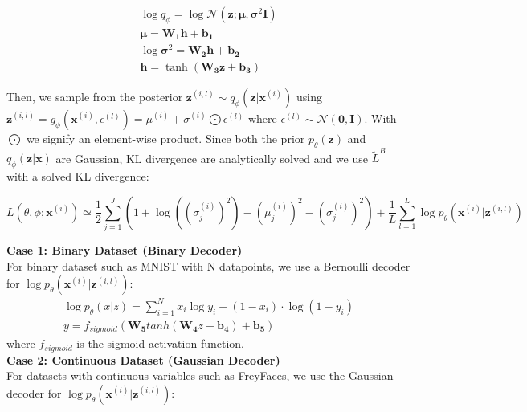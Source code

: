 \documentclass[11pt]{article}
\begin{document}
\begin{eqnarray}
\log q_\phi=\log\mathcal{N}(\mathbf{z}; \mathbf{\mu}, \mathbf{\sigma}^2\mathbf{I})\\
\mathbf{\mu}=\mathbf{W_1h}+\mathbf{b_1}\\
\log\mathbf{\sigma}^2=\mathbf{W_2h}+\mathbf{b_2}\\
\mathbf{h}=\tanh(\mathbf{W_3z}+\mathbf{b_3})
\end{eqnarray}


Then, we sample from the posterior $\mathbf{z}^{(i,l)}\sim q_\phi(\mathbf{z}|\mathbf{x}^{(i)})$ using $\mathbf{z}^{(i,l)}=g_\phi(\mathbf{x}^{(i)},\epsilon^{(l)})=\mu^{(i)}+\sigma^{(i)}\bigodot\epsilon^{(l)}$ where $\epsilon^{(l)}\sim\mathcal{N}(\mathbf{0},\mathbf{I})$. With $\bigodot$ we signify an element-wise product. Since both the prior $p_\theta(\mathbf{z})$ and $q_\phi(\mathbf{z}|\mathbf{x})$ are Gaussian, KL divergence are analytically solved and we use $\widetilde{L}^B$ with a solved KL divergence:

\begin{equation}
L(\theta, \phi; \mathbf{x}^{(i)})\simeq\frac{1}{2}\sum_{j=1}^J(1+\log((\sigma_j^{(i)})^2)-(\mu_j^{(i)})^2-(\sigma_j^{(i)})^2)+\frac{1}{L}\sum_{l=1}^{L}\log p_\theta(\mathbf{x}^{(i)}|\mathbf{z}^{(i,l)})
\end{equation}

\vspace{3mm}
\noindent
\textbf{Case 1: Binary Dataset (Binary Decoder)}\\
For binary dataset such as MNIST with N datapoints, we use a Bernoulli decoder for $\log p_\theta(\mathbf{x}^{(i)}|\mathbf{z}^{(i,l)})$:
\begin{eqnarray}
\log p_{\theta}(x|z) =\sum_{i=1}^N x_i \log y_i + (1-x_i)\cdot\log (1-y_i)\\
y=f_{sigmoid}(\mathbf{W_5}tanh(\mathbf{W_4}z+\mathbf{b_4})+\mathbf{b_5})
\end{eqnarray}
where $f_{sigmoid}$ is the sigmoid activation function.\\

\vspace{3mm}
\noindent
\textbf{Case 2: Continuous Dataset (Gaussian Decoder)}\\
For datasets with continuous variables such as FreyFaces, we use the Gaussian decoder for $\log p_\theta(\mathbf{x}^{(i)}|\mathbf{z}^{(i,l)})$:
\end{document}

